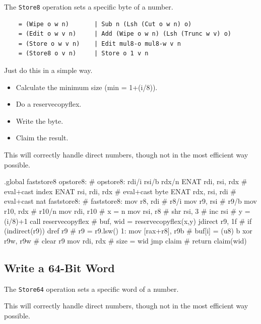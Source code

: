 The \lstinline|Store8| operation sets a specific byte of a number.

\begin{verbatim}
    = (Wipe o w n)       | Sub n (Lsh (Cut o w n) o)
    = (Edit o w v n)     | Add (Wipe o w n) (Lsh (Trunc w v) o)
    = (Store o w v n)    | Edit mul8-o mul8-w v n
    = (Store8 o v n)     | Store o 1 v n
\end{verbatim}

Just do this in a simple way.

\begin{itemize}
\item Calculate the minimum size (min = 1+(i/8)).
\item Do a reservecopyflex.
\item Write the byte.
\item Claim the result.
\end{itemize}

This will correctly handle direct numbers, though not in the most
efficient way possible.

\begin{asm}
.global faststore8
opstore8:                                   # opstore8: rdi/i rsi/b rdx/n
	ENAT	rdi, rsi, rdx               #  eval+cast index
	ENAT	rsi, rdi, rdx               #  eval+cast byte
	ENAT	rdx, rsi, rdi               #  eval+cast nat
faststore8:                                 # faststore8:
	mov	r8, rdi                     #   r8/i
	mov	r9, rsi                     #   r9/b
	mov	r10, rdx                    #   r10/n
	mov	rdi, r10                    #   x = n
	mov	rsi, r8                     #
	shr	rsi, 3                      #
	inc	rsi                         #   y = (i/8)+1
	call	reservecopyflex             #   buf, wid = reservecopyflex(x,y)
	jdirect	r9, 1f                      #   if (indirect(r9))
	dref	r9                          #     r9 = r9.lsw()
1:	mov	[rax+r8], r9b               #   buf[i] = (u8) b
	xor	r9w, r9w                    #   clear r9
	mov	rdi, rdx                    #   size = wid
	jmp	claim                       #   return claim(wid)
\end{asm}

\subsection{Write a 64-Bit Word}

The \lstinline|Store64| operation sets a specific word of a number.

This will correctly handle direct numbers, though not in the most
efficient way possible.

